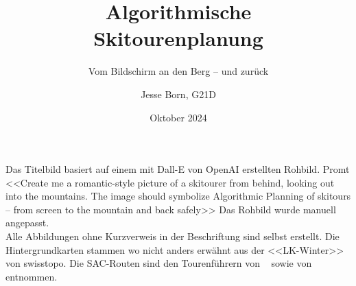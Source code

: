 \documentclass[a4paper, listof=numbered, numbers=noenddot]{scrarticle}
\title{\AKAfont\Huge\textcolor{AKSAcolor}{Algorithmische\\Skitourenplanung}}
\subtitle{Vom Bildschirm an den Berg -- und zurück}
\author{Jesse Born, G21D}
\date{Oktober 2024}
\begin{document}

\maketitle
\tableofcontents

% 






\clearpage


\printbibliography[heading=bibnumbered]
\clearpage

\appendix
{}
\printglossary[type=\acronymtype, title={Abkürzungsverzeichnis}, nonumberlist]
\clearpage
\listoffigures


Das Titelbild basiert auf einem mit Dall-E von OpenAI erstellten Rohbild. Promt <<Create me a romantic-style picture of a skitourer from behind, looking out into the mountains. The image should symbolize Algorithmic Planning of skitours -- from screen to the mountain and back safely>> Das Rohbild wurde manuell angepasst.\\

Alle Abbildungen ohne Kurzverweis in der Beschriftung sind selbst erstellt. Die Hintergrundkarten stammen wo nicht anders erwähnt aus der <<LK-Winter>> von swisstopo. Die SAC-Routen sind den Tourenführern  von \citeauthor{mmzentralch}~\cite{mmzentralch} sowie  von \citeauthor{twslstgallappzll}~\cite{twslstgallappzll} entnommen.
\clearpage

\end{document}
